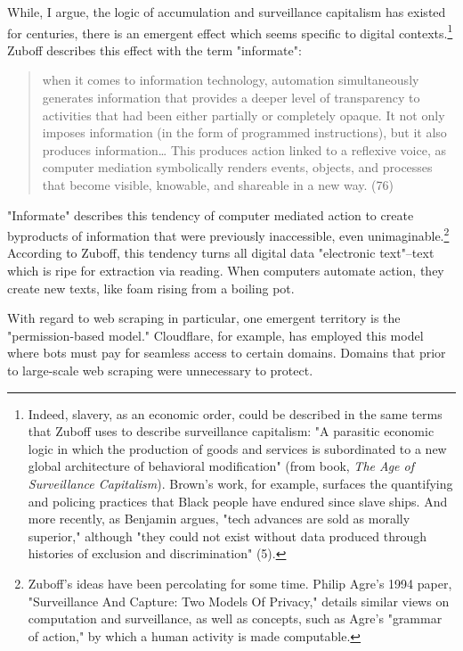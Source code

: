 \documentclass[11pt]{article}
\begin{document}
\begin{enumerate}
While, I argue, the logic of accumulation and surveillance capitalism
has existed for centuries, there is an emergent effect which seems
specific to digital contexts.\footnote{Indeed, slavery, as an economic order, could be described in
the same terms that Zuboff uses to describe surveillance capitalism:
"A parasitic economic logic in which the production of goods and
services is subordinated to a new global architecture of behavioral
modification" (from book, \emph{The Age of Surveillance Capitalism}).
Brown's work, for example, surfaces the quantifying and policing
practices that Black people have endured since slave ships. And more
recently, as Benjamin argues, "tech advances are sold as morally
superior," although "they could not exist without data produced
through histories of exclusion and discrimination" (5).} Zuboff describes this effect with
the term "informate":
\begin{quote}
when it comes to information technology, automation simultaneously
generates information that provides a deeper level of transparency to
activities that had been either partially or completely opaque. It not
only imposes information (in the form of programmed instructions), but
it also produces information\ldots{} This produces action linked to a
reﬂexive voice, as computer mediation symbolically renders events,
objects, and processes that become visible, knowable, and shareable in
a new way. (76)
\end{quote}
"Informate" describes this tendency of computer mediated action to
create byproducts of information that were previously inaccessible,
even unimaginable.\footnote{Zuboff's ideas have been percolating for some time. Philip
Agre's 1994 paper, "Surveillance And Capture: Two Models Of Privacy,"
details similar views on computation and surveillance, as well as
concepts, such as Agre's "grammar of action," by which a human
activity is made computable.} According to Zuboff, this tendency turns all
digital data "electronic text"--text which is ripe for extraction via
reading. When computers automate action, they create new texts, like
foam rising from a boiling pot.

With regard to web scraping in particular, one emergent territory is
the "permission-based model." Cloudflare, for example, has employed
this model where bots must pay for seamless access to certain domains.
Domains that prior to large-scale web scraping were unnecessary to
protect.


\end{enumerate}
\end{document}
